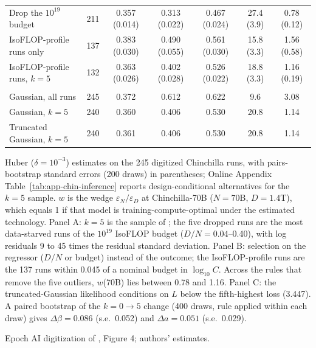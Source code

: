 \begin{table}[tp]
\begin{tabular}{@{}lcccccc@{}}
Drop the $10^{19}$ budget & 211 & 0.357 (0.014) & 0.313 (0.022) & 0.467 (0.024) & 27.4 (3.9) & 0.78 (0.12) \\
IsoFLOP-profile runs only & 137 & 0.383 (0.030) & 0.490 (0.055) & 0.561 (0.030) & 15.8 (3.3) & 1.56 (0.58) \\
IsoFLOP-profile runs, $k=5$ & 132 & 0.363 (0.026) & 0.402 (0.028) & 0.526 (0.022) & 18.8 (3.3) & 1.16 (0.19) \\
\addlinespace
\multicolumn{7}{@{}l}{\textit{Panel C. Gaussian likelihood and truncated regression}} \\
Gaussian, all runs & 245 & 0.372 & 0.612 & 0.622 & 9.6 & 3.08 \\
Gaussian, $k=5$ & 240 & 0.360 & 0.406 & 0.530 & 20.8 & 1.14 \\
Truncated Gaussian, $k=5$ & 240 & 0.361 & 0.406 & 0.530 & 20.8 & 1.14 \\
\bottomrule
\end{tabular}
\par\smallskip
\begin{tablenotes}Huber ($\delta=10^{-3}$) estimates on the 245 digitized Chinchilla runs, with pairs-bootstrap standard errors (200 draws) in parentheses; Online Appendix Table~\ref{tab:app-chin-inference} reports design-conditional alternatives for the $k=5$ sample. $w$ is the wedge $\varepsilon_N/\varepsilon_D$ at Chinchilla-70B ($N=70$B, $D=1.4$T), which equals 1 if that model is training-compute-optimal under the estimated technology. Panel A: $k=5$ is the sample of \citet{besiroglu2024chinchilla}; the five dropped runs are the most data-starved runs of the $10^{19}$ IsoFLOP budget ($D/N=0.04$--0.40), with log residuals 9 to 45 times the residual standard deviation. Panel B: selection on the regressor ($D/N$ or budget) instead of the outcome; the IsoFLOP-profile runs are the 137 runs within 0.045 of a nominal budget in $\log_{10}C$. Across the rules that remove the five outliers, $w$(70B) lies between 0.78 and 1.16. Panel C: the truncated-Gaussian likelihood \citep{hausman1977social} conditions on $L$ below the fifth-highest loss (3.447). A paired bootstrap of the $k=0\to5$ change (400 draws, rule applied within each draw) gives $\Delta\beta=0.086$ (s.e.\ 0.052) and $\Delta a=0.051$ (s.e.\ 0.029).\end{tablenotes}
\begin{tablenotes}[Source]Epoch AI digitization of \citet{hoffmann2022training}, Figure 4; authors' estimates.\end{tablenotes}
\end{table}
